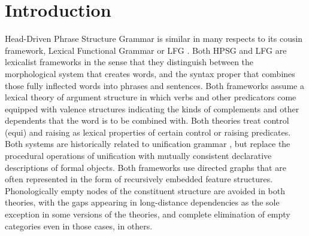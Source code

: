 






\label{chap-lfg}

\maketitle

\section{Introduction} 
Head-Driven Phrase Structure Grammar is similar in many respects to its cousin framework, Lexical Functional Grammar or LFG \citep{BATW2015a,dalrymple;ea19}.  Both  HPSG and LFG are lexicalist frameworks in the sense that they distinguish between the morphological system that creates words, and the syntax proper that combines those fully inflected words into phrases and sentences.  Both frameworks assume a lexical theory of argument structure \citep{MWArgSt} in which verbs and other predicators come equipped with valence structures indicating the kinds of complements and other dependents that the word is to be combined with.  Both theories treat control (equi) and raising as lexical properties of certain control or raising predicates.  Both systems are historically related to unification grammar \citep{Kay84a-u}, but replace the procedural operations of unification with mutually consistent declarative  descriptions of formal objects.  Both frameworks use directed graphs that are often represented in the form of recursively embedded feature structures.
Phonologically empty nodes of the constituent structure are avoided in both theories, with the gaps appearing in long-distance dependencies as the sole exception in some versions of the theories, and complete elimination of empty categories even in those cases, in others.   

